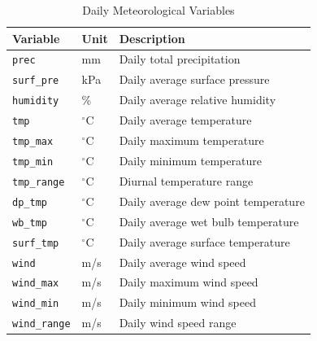 \documentclass[conference]{IEEEtran}
\begin{document}
\begin{table}[htbp]
\caption{Daily Meteorological Variables}
\begin{center}
\begin{tabular}{lll}
\toprule
\textbf{Variable} & \textbf{Unit} & \textbf{Description} \\
\midrule
\texttt{prec}      & mm            & Daily total precipitation \\
\texttt{surf\_pre} & kPa           & Daily average surface pressure \\
\texttt{humidity}  & \%            & Daily average relative humidity \\
\texttt{tmp}       & $^\circ$C     & Daily average temperature \\
\texttt{tmp\_max}  & $^\circ$C     & Daily maximum temperature \\
\texttt{tmp\_min}  & $^\circ$C     & Daily minimum temperature \\
\texttt{tmp\_range}& $^\circ$C     & Diurnal temperature range \\
\texttt{dp\_tmp}   & $^\circ$C     & Daily average dew point temperature \\
\texttt{wb\_tmp}   & $^\circ$C     & Daily average wet bulb temperature \\
\texttt{surf\_tmp} & $^\circ$C     & Daily average surface temperature \\
\texttt{wind}      & m/s           & Daily average wind speed \\
\texttt{wind\_max} & m/s           & Daily maximum wind speed \\
\texttt{wind\_min} & m/s           & Daily minimum wind speed \\
\texttt{wind\_range}& m/s          & Daily wind speed range \\
\bottomrule
\end{tabular}
\label{tab:variables}
\end{center}
\end{table}
\end{document}
